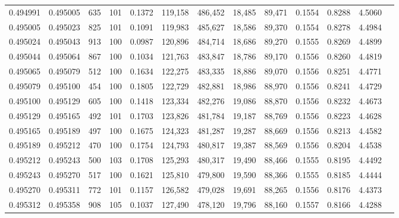\begin{tabular}{rrrrrrrrrrrrr}
0.494991 & 0.495005 &   635 & 101 &                                     0.1372 & 119,158 & 486,452 &  18,485 &  89,471 & 0.1554 & 0.8288 & 4.5060 \\
0.495005 & 0.495023 &   825 & 101 &                                     0.1091 & 119,983 & 485,627 &  18,586 &  89,370 & 0.1554 & 0.8278 & 4.4984 \\
0.495024 & 0.495043 &   913 & 100 &                                     0.0987 & 120,896 & 484,714 &  18,686 &  89,270 & 0.1555 & 0.8269 & 4.4899 \\
0.495044 & 0.495064 &   867 & 100 &                                     0.1034 & 121,763 & 483,847 &  18,786 &  89,170 & 0.1556 & 0.8260 & 4.4819 \\
0.495065 & 0.495079 &   512 & 100 &                                     0.1634 & 122,275 & 483,335 &  18,886 &  89,070 & 0.1556 & 0.8251 & 4.4771 \\
0.495079 & 0.495100 &   454 & 100 &                                     0.1805 & 122,729 & 482,881 &  18,986 &  88,970 & 0.1556 & 0.8241 & 4.4729 \\
0.495100 & 0.495129 &   605 & 100 &                                     0.1418 & 123,334 & 482,276 &  19,086 &  88,870 & 0.1556 & 0.8232 & 4.4673 \\
0.495129 & 0.495165 &   492 & 101 &                                     0.1703 & 123,826 & 481,784 &  19,187 &  88,769 & 0.1556 & 0.8223 & 4.4628 \\
0.495165 & 0.495189 &   497 & 100 &                                     0.1675 & 124,323 & 481,287 &  19,287 &  88,669 & 0.1556 & 0.8213 & 4.4582 \\
0.495189 & 0.495212 &   470 & 100 &                                     0.1754 & 124,793 & 480,817 &  19,387 &  88,569 & 0.1556 & 0.8204 & 4.4538 \\
0.495212 & 0.495243 &   500 & 103 &                                     0.1708 & 125,293 & 480,317 &  19,490 &  88,466 & 0.1555 & 0.8195 & 4.4492 \\
0.495243 & 0.495270 &   517 & 100 &                                     0.1621 & 125,810 & 479,800 &  19,590 &  88,366 & 0.1555 & 0.8185 & 4.4444 \\
0.495270 & 0.495311 &   772 & 101 &                                     0.1157 & 126,582 & 479,028 &  19,691 &  88,265 & 0.1556 & 0.8176 & 4.4373 \\
0.495312 & 0.495358 &   908 & 105 &                                     0.1037 & 127,490 & 478,120 &  19,796 &  88,160 & 0.1557 & 0.8166 & 4.4288 \\

\end{tabular}
